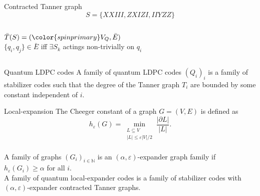 \begin{frame}[c]{Contracted Tanner graph}
  \centering
  \Large
  \begin{equation*}
    S = 
    \lbrace
     XXIII,
     ZXIZI,
     IIYZZ
    \rbrace
  \end{equation*}
  \begin{columns}[c]
    \pause
    \begin{column}{0.45\textwidth}
      \centering
      $\bar{T}(S) = ({\color{spinprimary}V_Q}, \bar{E})$
      \\
      $\lbrace q_i, q_j\rbrace \in \bar E$ iff $\exists S_k$ actings non-trivially on $q_i$
    \end{column}
    \pause
    \begin{column}{0.4\textwidth}
      \centering
    \end{column}
  \end{columns}
\end{frame}


\begin{frame}[c]{Quantum LDPC codes}
  \centering
  \Large
  A family of quantum LDPC codes $(Q_i)_i$ is a family
  of stabilizer codes such that the degree of the Tanner graph $T_i$ 
  are bounded by some constant independent of $i$.
\end{frame}

\begin{frame}[c]{Local-expansion}
  \centering
  \Large
  The Cheeger constant of a graph $G = (V, E)$ is defined as 
  \begin{equation*}
    h_{\varepsilon}(G) 
    = 
    \min_{\substack{
      L \subseteq V \\
      |L| \leq \varepsilon |V| / 2
    }}
    \frac
      {|\partial L|}
      {|L|}.
  \end{equation*}
  \\[2mm]
  \pause
  A family of graphs $(G_i)_{i\in \mathbb N}$ is an $(\alpha, \varepsilon)$-expander
  graph family if $h_{\varepsilon}(G_i) \geq \alpha$ for all $i$.
  \\[4mm]
  \pause
  A family of quantum local-expander codes is a family of stabilizer codes with $(\alpha, \varepsilon)$-expander
  contracted Tanner graphs.
\end{frame}

